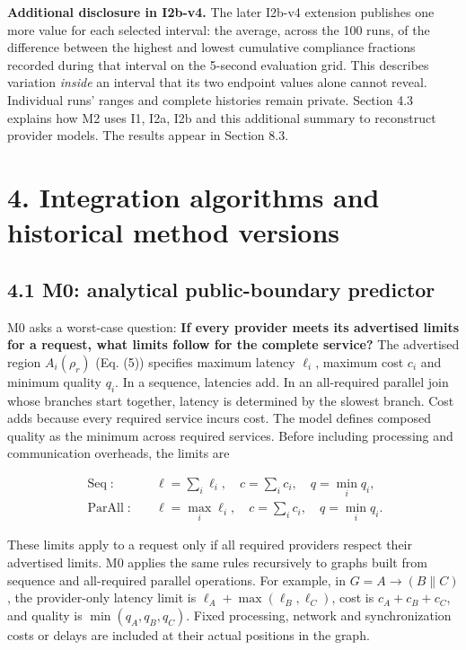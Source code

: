 \documentclass[10pt,a4paper]{article}
\begin{document}
\textbf{Additional disclosure in I2b-v4.} The later I2b-v4 extension publishes one more value for each selected interval: the average, across the 100 runs, of the difference between the highest and lowest cumulative compliance fractions recorded during that interval on the 5-second evaluation grid. This describes variation \emph{inside} an interval that its two endpoint values alone cannot reveal. Individual runs' ranges and complete histories remain private. Section 4.3 explains how M2 uses I1, I2a, I2b and this additional summary to reconstruct provider models. The results appear in Section 8.3.

\section*{4. Integration algorithms and historical method versions}

\subsection*{4.1 M0: analytical public-boundary predictor}

M0 asks a worst-case question: \textbf{If every provider meets its advertised limits for a request, what limits follow for the complete service?} The advertised region $A_i(\rho_r)$ (Eq. (5)) specifies maximum latency $\ell_i$, maximum cost $c_i$ and minimum quality $q_i$. In a sequence, latencies add. In an all-required parallel join whose branches start together, latency is determined by the slowest branch. Cost adds because every required service incurs cost. The model defines composed quality as the minimum across required services. Before including processing and communication overheads, the limits are

\begin{equation*}
\begin{aligned}
\operatorname{Seq}:&\quad
\ell=\sum_i\ell_i,\quad c=\sum_i c_i,\quad q=\min_i q_i,\\
\operatorname{ParAll}:&\quad
\ell=\max_i\ell_i,\quad c=\sum_i c_i,\quad q=\min_i q_i.
\end{aligned}
\tag{7}
\end{equation*}

These limits apply to a request only if all required providers respect their advertised limits. M0 applies the same rules recursively to graphs built from sequence and all-required parallel operations. For example, in $G=A\to(B\parallel C)$, the provider-only latency limit is $\ell_A+\max(\ell_B,\ell_C)$, cost is $c_A+c_B+c_C$, and quality is $\min(q_A,q_B,q_C)$. Fixed processing, network and synchronization costs or delays are included at their actual positions in the graph.
\end{document}
